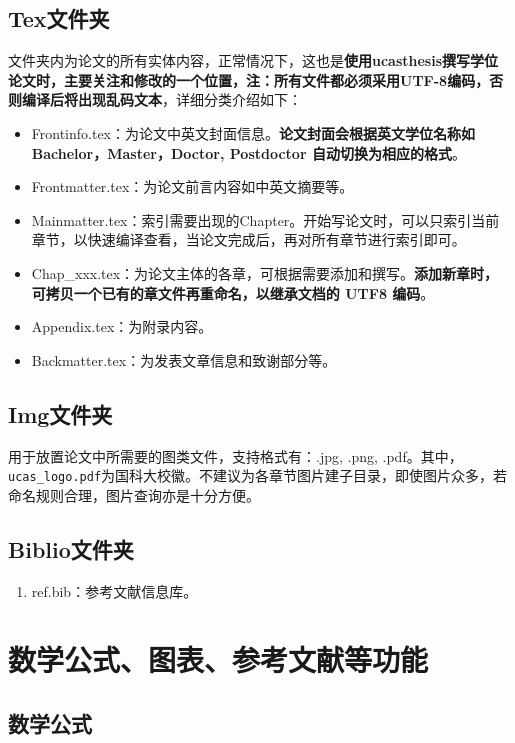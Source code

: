 \subsection{Tex文件夹}

文件夹内为论文的所有实体内容，正常情况下，这也是\textbf{使用ucasthesis撰写学位论文时，主要关注和修改的一个位置，注：所有文件都必须采用UTF-8编码，否则编译后将出现乱码文本}，详细分类介绍如下：

\begin{itemize}
    \item Frontinfo.tex：为论文中英文封面信息。\textbf{论文封面会根据英文学位名称如Bachelor，Master，Doctor, Postdoctor 自动切换为相应的格式}。
    \item Frontmatter.tex：为论文前言内容如中英文摘要等。
    \item Mainmatter.tex：索引需要出现的Chapter。开始写论文时，可以只索引当前章节，以快速编译查看，当论文完成后，再对所有章节进行索引即可。
    \item Chap{\_}xxx.tex：为论文主体的各章，可根据需要添加和撰写。\textbf{添加新章时，可拷贝一个已有的章文件再重命名，以继承文档的 UTF8 编码}。
    \item Appendix.tex：为附录内容。
    \item Backmatter.tex：为发表文章信息和致谢部分等。
\end{itemize}

\subsection{Img文件夹}

用于放置论文中所需要的图类文件，支持格式有：.jpg, .png, .pdf。其中，\verb|ucas_logo.pdf|为国科大校徽。不建议为各章节图片建子目录，即使图片众多，若命名规则合理，图片查询亦是十分方便。

\subsection{Biblio文件夹}

\begin{enumerate}
    \item ref.bib：参考文献信息库。
\end{enumerate}

\section{数学公式、图表、参考文献等功能}

\subsection{数学公式}


